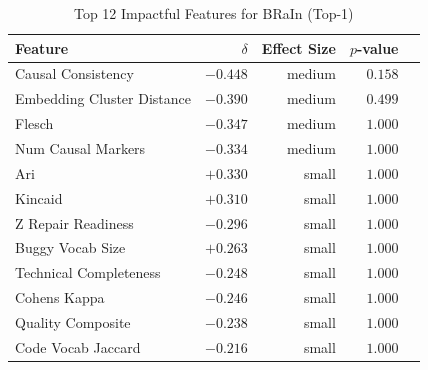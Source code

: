 
\begin{table}[h]
\centering
\caption{Top 12 Impactful Features for BRaIn (Top-1)}
\label{tab:tool_features_brain_top1}
\begin{tabular}{lrrrr}
\toprule
Feature & $\delta$ & Effect Size & $p$-value \\
\midrule
Causal Consistency & $-0.448$ & medium & $0.158$ \\
Embedding Cluster Distance & $-0.390$ & medium & $0.499$ \\
Flesch & $-0.347$ & medium & $1.000$ \\
Num Causal Markers & $-0.334$ & medium & $1.000$ \\
Ari & $+0.330$ & small & $1.000$ \\
Kincaid & $+0.310$ & small & $1.000$ \\
Z Repair Readiness & $-0.296$ & small & $1.000$ \\
Buggy Vocab Size & $+0.263$ & small & $1.000$ \\
Technical Completeness & $-0.248$ & small & $1.000$ \\
Cohens Kappa & $-0.246$ & small & $1.000$ \\
Quality Composite & $-0.238$ & small & $1.000$ \\
Code Vocab Jaccard & $-0.216$ & small & $1.000$ \\
\bottomrule
\end{tabular}
\end{table}


